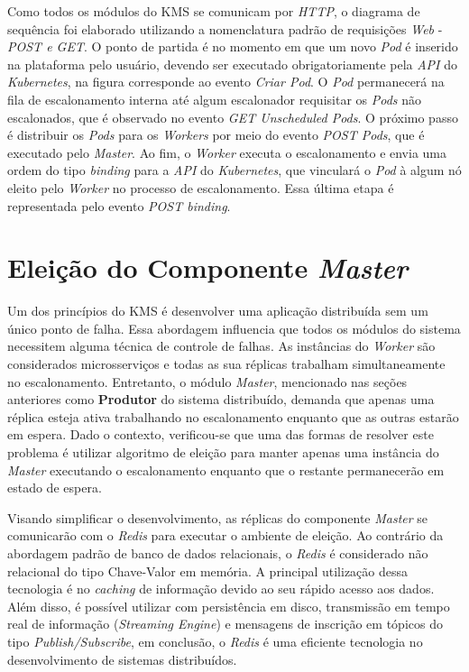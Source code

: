 Como todos os módulos do \ac{KMS} se comunicam por \textit{HTTP}, o diagrama de sequência foi elaborado utilizando a nomenclatura padrão de requisições \textit{Web} - \textit{POST e GET}. O ponto de partida é no momento em que um novo \textit{Pod} é inserido na plataforma pelo usuário, devendo ser executado obrigatoriamente pela \textit{API} do \textit{Kubernetes}, na figura corresponde ao evento \textit{Criar Pod}. O \textit{Pod} permanecerá na fila de escalonamento interna até algum escalonador requisitar os \textit{Pods} não escalonados, que é observado no evento \textit{GET Unscheduled Pods}. O próximo passo é distribuir os \textit{Pods} para os \textit{Workers} por meio do evento \textit{POST Pods}, que é executado pelo \textit{Master}. Ao fim, o \textit{Worker} executa o escalonamento e envia uma ordem do tipo \textit{binding} para a \textit{API} do \textit{Kubernetes}, que vinculará o \textit{Pod} à algum nó eleito pelo \textit{Worker} no processo de escalonamento. Essa última etapa é representada pelo evento \textit{POST binding}.


\section{Eleição do Componente \textit{Master} \label{eleicao-master}}

Um dos princípios do \ac{KMS} é desenvolver uma aplicação distribuída sem um único ponto de falha. Essa abordagem influencia que todos os módulos do sistema necessitem alguma técnica de controle de falhas. As instâncias do \textit{Worker} são considerados microsserviços e todas as sua réplicas trabalham simultaneamente no escalonamento. Entretanto, o módulo \textit{Master}, mencionado nas seções anteriores como \textbf{Produtor} do sistema distribuído, demanda que apenas uma réplica esteja ativa trabalhando no escalonamento enquanto que as outras estarão em espera. Dado o contexto, verificou-se que uma das formas de resolver este problema é utilizar algoritmo de eleição para manter apenas uma instância do \textit{Master} executando o escalonamento enquanto que o restante permanecerão em estado de espera.

Visando simplificar o desenvolvimento, as réplicas do componente \textit{Master} se comunicarão com o \textit{Redis} \cite{Redis} para executar o ambiente de eleição. Ao contrário da abordagem padrão de banco de dados relacionais, o \textit{Redis} é considerado não relacional do tipo Chave-Valor em memória. A principal utilização dessa tecnologia é no \textit{caching} de informação devido ao seu rápido acesso aos dados. Além disso, é possível utilizar com persistência em disco, transmissão em tempo real de informação (\textit{Streaming Engine}) e mensagens de inscrição em tópicos do tipo \textit{Publish/Subscribe}, em conclusão, o \textit{Redis} é uma eficiente tecnologia no desenvolvimento de sistemas distribuídos.

